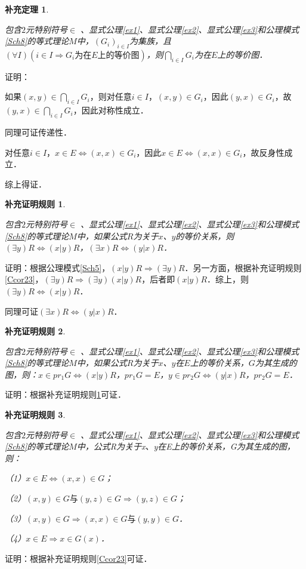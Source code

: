 \documentclass[12pt, a4paper, oneside]{book}
\newtheorem{Ccor}{补充证明规则}
\newtheorem{cor}{补充定理}
\begin{document}
			\begin{cor}\label{cor145}
				\hfill\par
				包含$2$元特别符号$\in$ 、显式公理\ref{ex1}、显式公理\ref{ex2}、显式公理\ref{ex3}和公理模式\ref{Sch8}的等式理论$M$中，$(G_i)_{i\in I}$为集族，且$(\forall I)(i\in I\Rightarrow G_i\text{为在}E\text{上的等价图})$，则$\bigcap\limits_{i\in I}G_i$为在$E$上的等价图．
			\end{cor}				
			证明：
			\par
			如果$(x, y)\in \bigcap\limits_{i\in I}G_i$，则对任意$i\in I$，$(x, y)\in G_i$，因此$(y, x)\in G_i$，故$(y, x)\in \bigcap\limits_{i\in I}G_i$，因此对称性成立．
			\par
			同理可证传递性．
			\par
			对任意$i\in I$，$x\in E\Leftrightarrow (x, x)\in G_i$，因此$x\in E\Leftrightarrow (x, x)\in G_i$，故反身性成立．
			\par
			综上得证．

			\begin{Ccor}\label{Ccor27}
				\hfill\par
				包含$2$元特别符号$\in$ 、显式公理\ref{ex1}、显式公理\ref{ex2}、显式公理\ref{ex3}和公理模式\ref{Sch8}的等式理论$M$中，如果公式$R$为关于$x$、$y$的等价关系，则$(\exists y)R\Leftrightarrow (x|y)R$，$(\exists x)R\Leftrightarrow (y|x)R$．
			\end{Ccor}				
			证明：根据公理模式\ref{Sch5}，$(x|y)R\Rightarrow (\exists y)R$．另一方面，根据补充证明规则\ref{Ccor23}，$(\exists y)R\Rightarrow (\exists y)(x|y)R$，后者即$(x|y)R$．综上，则$(\exists y)R\Leftrightarrow (x|y)R$．
			\par
			同理可证$(\exists x)R\Leftrightarrow (y|x)R$．

			\begin{Ccor}\label{Ccor28}
				\hfill\par
				包含$2$元特别符号$\in$ 、显式公理\ref{ex1}、显式公理\ref{ex2}、显式公理\ref{ex3}和公理模式\ref{Sch8}的等式理论$M$中，如果公式$R$为关于$x$、$y$在$E$上的等价关系，$G$为其生成的图，则：$x\in pr_1G\Leftrightarrow (x|y)R$，$pr_1G=E$，$y\in pr_2G\Leftrightarrow (y|x)R$，$pr_2G=E$．
			\end{Ccor}				
			证明：根据补充证明规则\ref{Ccor27}可证．

			\begin{Ccor}\label{Ccor29}
				\hfill\par
				包含$2$元特别符号$\in$ 、显式公理\ref{ex1}、显式公理\ref{ex2}、显式公理\ref{ex3}和公理模式\ref{Sch8}的等式理论$M$中，公式R为关于x、y在E上的等价关系，G为其生成的图，则：
				\par
				（1）$x\in E\Leftrightarrow (x, x)\in G$；
				\par
				（2）$(x, y)\in G\text{与}(y, z) \in G\Rightarrow (y, z)\in G$；
				\par
				（3）$(x, y)\in G\Rightarrow (x, x)\in G\text{与}(y, y)\in G$．
				\par
				（4）$x\in E\Rightarrow x\in G(x)$．
			\end{Ccor}				
			证明：根据补充证明规则\ref{Ccor23}可证．
			
\end{document}
